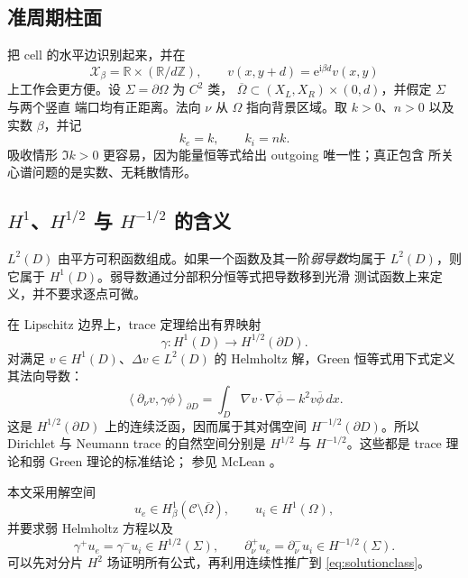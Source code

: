 \documentclass[UTF8,11pt,fontset=fandol]{ctexart}
\newcommand{\C}{\mathcal C}
\newcommand{\Om}{\Omega}
\newcommand{\Sig}{\Sigma}
\newcommand{\R}{\mathbb R}
\newcommand{\Z}{\mathbb Z}
\newcommand{\ii}{\mathrm i}
\newcommand{\ee}{\mathrm e}
\newcommand{\pair}[2]{\left\langle #1,#2\right\rangle}
\theoremstyle{plain}
\theoremstyle{definition}
\theoremstyle{remark}
\begin{document}
\subsection{准周期柱面}

把 cell 的水平边识别起来，并在
\[
\mathscr X_\beta=\R\times(\R/d\Z),\qquad
v(x,y+d)=\ee^{\ii\beta d}v(x,y)
\]
上工作会更方便。设 \(\Sig=\partial\Om\) 为 \(C^2\) 类，
\(\overline\Om\subset(X_L,X_R)\times(0,d)\)，并假定 \(\Sig\) 与两个竖直
端口均有正距离。法向 \(\nu\) 从 \(\Om\) 指向背景区域。取 \(k>0\)、\(n>0\)
以及实数 \(\beta\)，并记
\[
k_e=k,\qquad k_i=nk.
\]
吸收情形 \(\Im k>0\) 更容易，因为能量恒等式给出 outgoing 唯一性；真正包含
所关心谱问题的是实数、无耗散情形。

\subsection{\texorpdfstring{\(H^1\)、\(H^{1/2}\) 与 \(H^{-1/2}\)}{H1、H1/2 与 H-1/2} 的含义}

\(L^2(D)\) 由平方可积函数组成。如果一个函数及其一阶\emph{弱导数}均属于
\(L^2(D)\)，则它属于 \(H^1(D)\)。弱导数通过分部积分恒等式把导数移到光滑
测试函数上来定义，并不要求逐点可微。

在 Lipschitz 边界上，trace 定理给出有界映射
\[
\gamma:H^1(D)\longrightarrow H^{1/2}(\partial D).
\]
对满足 \(v\in H^1(D)\)、\(\Delta v\in L^2(D)\) 的 Helmholtz 解，Green
恒等式用下式定义其法向导数：
\begin{equation}
\pair{\partial_\nu v}{\gamma\phi}_{\partial D}
=\int_D \nabla v\cdot\nabla\overline\phi-k^2v\overline\phi\,dx.
\label{eq:weaknormal}
\end{equation}
这是 \(H^{1/2}(\partial D)\) 上的连续泛函，因而属于其对偶空间
\(H^{-1/2}(\partial D)\)。所以 Dirichlet 与 Neumann trace 的自然空间分别是
\(H^{1/2}\) 与 \(H^{-1/2}\)。这些都是 trace 理论和弱 Green 理论的标准结论；
参见 McLean \cite[第 3--4 章]{McLean2000}。

本文采用解空间
\begin{equation}
u_e\in H^1_\beta(\C\setminus\overline\Om),\qquad
u_i\in H^1(\Om),
\label{eq:solutionclass}
\end{equation}
并要求弱 Helmholtz 方程以及
\begin{equation}
\gamma^+u_e=\gamma^-u_i\in H^{1/2}(\Sig),\qquad
\partial_\nu^+u_e=\partial_\nu^-u_i\in H^{-1/2}(\Sig).
\label{eq:transmission}
\end{equation}
可以先对分片 \(H^2\) 场证明所有公式，再利用连续性推广到
\eqref{eq:solutionclass}。
\end{document}
